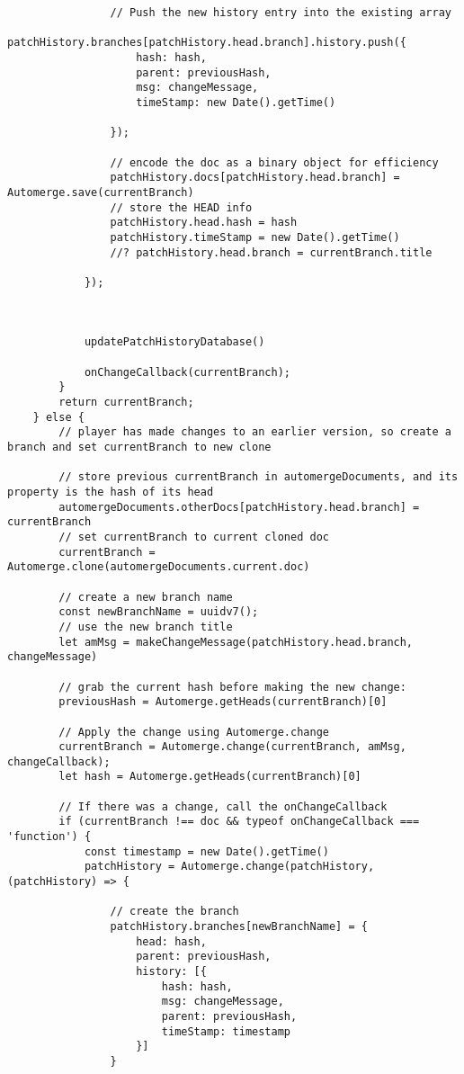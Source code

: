 \begin{lstlisting}
                // Push the new history entry into the existing array
                patchHistory.branches[patchHistory.head.branch].history.push({
                    hash: hash,
                    parent: previousHash,
                    msg: changeMessage,
                    timeStamp: new Date().getTime()

                });

                // encode the doc as a binary object for efficiency
                patchHistory.docs[patchHistory.head.branch] = Automerge.save(currentBranch)
                // store the HEAD info
                patchHistory.head.hash = hash
                patchHistory.timeStamp = new Date().getTime()
                //? patchHistory.head.branch = currentBranch.title
                
            });


            
            updatePatchHistoryDatabase()

            onChangeCallback(currentBranch);
        }
        return currentBranch;
    } else {
        // player has made changes to an earlier version, so create a branch and set currentBranch to new clone

        // store previous currentBranch in automergeDocuments, and its property is the hash of its head
        automergeDocuments.otherDocs[patchHistory.head.branch] = currentBranch
        // set currentBranch to current cloned doc
        currentBranch = Automerge.clone(automergeDocuments.current.doc)

        // create a new branch name
        const newBranchName = uuidv7();
        // use the new branch title
        let amMsg = makeChangeMessage(patchHistory.head.branch, changeMessage)

        // grab the current hash before making the new change:
        previousHash = Automerge.getHeads(currentBranch)[0]
        
        // Apply the change using Automerge.change
        currentBranch = Automerge.change(currentBranch, amMsg, changeCallback);
        let hash = Automerge.getHeads(currentBranch)[0]
        
        // If there was a change, call the onChangeCallback
        if (currentBranch !== doc && typeof onChangeCallback === 'function') {   
            const timestamp = new Date().getTime()
            patchHistory = Automerge.change(patchHistory, (patchHistory) => {

                // create the branch
                patchHistory.branches[newBranchName] = {
                    head: hash,
                    parent: previousHash,
                    history: [{
                        hash: hash,
                        msg: changeMessage,
                        parent: previousHash,
                        timeStamp: timestamp
                    }]
                }


\end{lstlisting}
